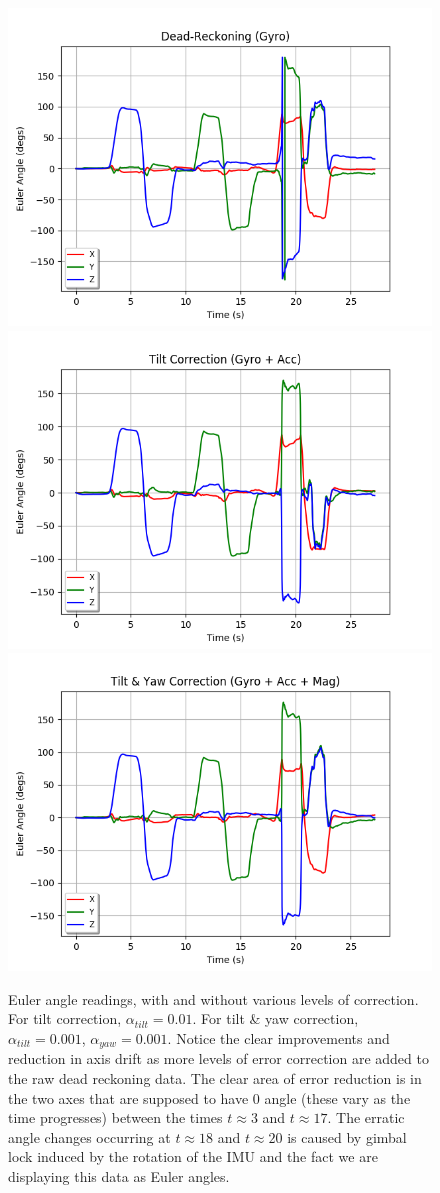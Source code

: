 \documentclass[11pt]{article}
\begin{document}
\begin{figure}[htp]

\centering
\includegraphics[width=.32\textwidth]{1gyro_dead}\hfill
\includegraphics[width=.32\textwidth]{2gyro_acc}\hfill
\includegraphics[width=.32\textwidth]{3gyro_acc_mag}

\caption{Euler angle readings, with and without various levels of correction. For tilt correction, $\alpha_{tilt}=0.01$. For tilt \& yaw correction, $\alpha_{tilt}=0.001$, $\alpha_{yaw}=0.001$. Notice the clear improvements and reduction in axis drift as more levels of error correction are added to the raw dead reckoning data. The clear area of error reduction is in the two axes that are supposed to have 0 angle (these vary as the time progresses) between the times $t\approx3$ and $t\approx17$. The erratic angle changes occurring at $t\approx18$ and $t\approx20$ is caused by gimbal lock induced by the rotation of the IMU and the fact we are displaying this data as Euler angles.}
\label{fig:euler-angles}

\end{figure}
\end{document}
